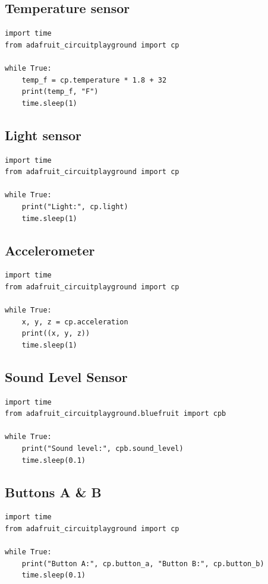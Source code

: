 \documentclass[11pt]{article}
\begin{document}
\subsection{Temperature sensor}

\begin{lstlisting}
import time
from adafruit_circuitplayground import cp

while True:
    temp_f = cp.temperature * 1.8 + 32
    print(temp_f, "F")
    time.sleep(1)
\end{lstlisting}

\subsection{Light sensor}

\begin{lstlisting}
import time
from adafruit_circuitplayground import cp

while True:
    print("Light:", cp.light)
    time.sleep(1)
\end{lstlisting}

\subsection{Accelerometer}

\begin{lstlisting}
import time
from adafruit_circuitplayground import cp

while True:
    x, y, z = cp.acceleration
    print((x, y, z))
    time.sleep(1)
\end{lstlisting}
\newpage
\subsection{Sound Level Sensor}

\begin{lstlisting}
import time
from adafruit_circuitplayground.bluefruit import cpb

while True:
    print("Sound level:", cpb.sound_level)
    time.sleep(0.1)
\end{lstlisting}

\subsection{Buttons A \& B}

\begin{lstlisting}
import time
from adafruit_circuitplayground import cp

while True:
    print("Button A:", cp.button_a, "Button B:", cp.button_b)
    time.sleep(0.1)
\end{lstlisting}
\end{document}
